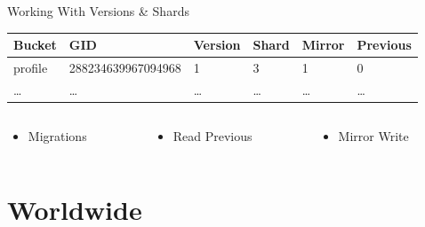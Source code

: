 \documentclass[aspectratio=169]{beamer}
\begin{document}
\begin{frame}{Working With Versions \& Shards}
    \begin{table}{
        \small
        \begin{tabular}{|l|l|l|l|l|l|}
            \hline
            \textbf{Bucket}&\textbf{GID}&\textbf{Version}&\textbf{Shard}&\textbf{Mirror}&\textbf{Previous}\\
            \hline
            profile&288234639967094968&1&3&1&0\\
            \dots&\dots&\dots&\dots&\dots&\dots\\
            \hline
        \end{tabular}}
    \end{table}
    \begin{columns}
        \begin{column}[c]{0.33\textwidth}
            \begin{itemize}
                \item Migrations
            \end{itemize}
        \end{column}
        \begin{column}[c]{0.33\textwidth}
            \begin{itemize}
                \item Read Previous
            \end{itemize}
        \end{column}
        \begin{column}[c]{0.33\textwidth}
            \begin{itemize}
                \item Mirror Write
            \end{itemize}
        \end{column}
    \end{columns}
\end{frame}

\section{Worldwide}
\end{document}
